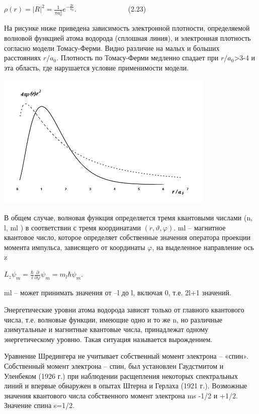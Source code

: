 \documentclass[a4paper,14pt, openany, twoside, draft]{extbook} %
\begin{document}
 $\rho (r)=|R|^2=\frac 1{\mathit{\pi a}_0^3}e^{-\frac{2r}{a_0}}$. \ \ \ \ \ \ \ \ \ \ \ \ \ \ (2.23)

На рисунке ниже приведена зависимость электронной плотности, определяемой волновой функцией атома водорода (сплошная линия), и электронная плотность согласно модели Томасу-Ферми. Видно различие на малых и больших расстояниях  $r/a_0$. Плотность по Томасу-Ферми медленно спадает при   $r/a_0${\textgreater}3-4  и эта область, где нарушается условие применимости модели.

 \includegraphics[width=10.421cm,height=6.514cm]{a2324-img001.png}

В общем случае, волновая функция определяется тремя квантовыми числами (n, l, ml ) в соответствии с тремя координатами  $(r,\vartheta ,\varphi )$. ml – магнитное квантовое число, которое определяет собственные значения оператора проекции момента импульса, зависящего от координаты ${\varphi}$, на выделенное направление ось z

 $L_z\psi _m=\frac{\hbar } i\frac{\partial }{\partial \varphi }\psi _m=m_l\hbar \psi _m$.

ml – может принимать значения от –l до l, включая 0, т.е. 2l+1 значений.

Энергетические уровни атома водорода зависят только от главного квантового числа, т.е. волновые функции, имеющие одно и то же n, но различные азимутальные и магнитные квантовые числа, принадлежат одному энергетическому уровню. Такая ситуация называется вырождением.

Уравнение Шредингера не учитывает собственный момент электрона – «спин». Собственный момент электрона – спин, был установлен Гаудстмитом и Уленбеком (1926 г.) при наблюдении расщепления некоторых спектральных линий и впервые обнаружен в опытах Штерна и Герлаха (1921 г.). Возможные значения квантового числа собственного момент электрона ms {}-1/2 и +1/2. Значение спина s=1/2.
\end{document}
